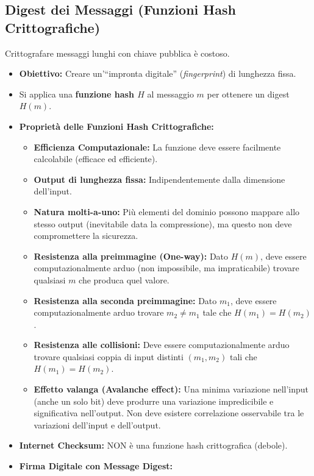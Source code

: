 \subsection{Digest dei Messaggi (Funzioni Hash Crittografiche)}
Crittografare messaggi lunghi con chiave pubblica è costoso.
\begin{itemize}
    \item \textbf{Obiettivo:} Creare un'\textquotedblleft impronta digitale\textquotedblright{} (\textit{fingerprint}) di lunghezza fissa.
    \item Si applica una \textbf{funzione hash $H$} al messaggio $m$ per ottenere un digest $H(m)$.
    \item \textbf{Proprietà delle Funzioni Hash Crittografiche:}
    \begin{itemize}
        \item \textbf{Efficienza Computazionale:} La funzione deve essere facilmente calcolabile (efficace ed efficiente).
        \item \textbf{Output di lunghezza fissa:} Indipendentemente dalla dimensione dell'input.
        \item \textbf{Natura molti-a-uno:} Più elementi del dominio possono mappare allo stesso output (inevitabile data la compressione), ma questo non deve compromettere la sicurezza.
        \item \textbf{Resistenza alla preimmagine (One-way):} Dato $H(m)$, deve essere computazionalmente arduo (non impossibile, ma impraticabile) trovare qualsiasi $m$ che produca quel valore.
        \item \textbf{Resistenza alla seconda preimmagine:} Dato $m_1$, deve essere computazionalmente arduo trovare $m_2 \neq m_1$ tale che $H(m_1) = H(m_2)$.
        \item \textbf{Resistenza alle collisioni:} Deve essere computazionalmente arduo trovare qualsiasi coppia di input distinti $(m_1, m_2)$ tali che $H(m_1) = H(m_2)$.
        \item \textbf{Effetto valanga (Avalanche effect):} Una minima variazione nell'input (anche un solo bit) deve produrre una variazione impredicibile e significativa nell'output. Non deve esistere correlazione osservabile tra le variazioni dell'input e dell'output.
    \end{itemize}
    \item \textbf{Internet Checksum:} NON è una funzione hash crittografica (debole).
    \item \textbf{Firma Digitale con Message Digest:}
    \begin{enumerate}

\end{enumerate}
\end{itemize}
